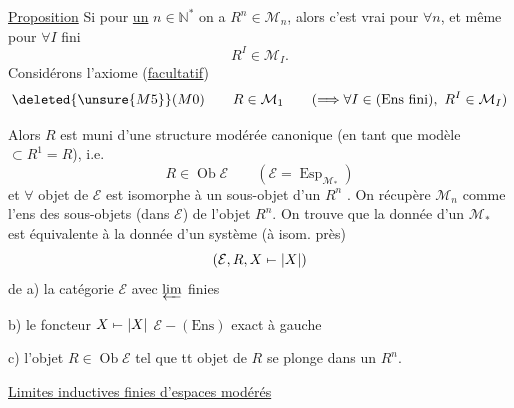 \uline{Proposition} Si pour \uline{un} $n\in\mathbb N^*$ on a  $R^n\in\mathcal M_n$, alors c'est vrai pour $\forall n$, et même pour $\forall I$ fini 
\[
R^I\in\mathcal M_I.
\]
Considérons l'axiome (\uline{facultatif})
\[
\deleted{\unsure{M5}}(M0)\qquad R\in\mathcal M_1\qquad(\Longrightarrow\forall I\in(\mathrm{Ens\ fini}),\ R^I\in\mathcal M_I)
\]

Alors $R$ est muni d'une structure modérée canonique (en tant que modèle $\subset R^1=R$), i.e.
\[
 R\in\operatorname{Ob}\mathcal E\qquad(\mathcal E=\operatorname{Esp}_{\mathcal M_*})
\]
et $\forall$ objet de $\mathcal E$ est isomorphe à un sous-objet d'un $R^n$ . On récupère $\mathcal M_n$ comme l'ens des  sous-objets (dans $\mathcal E$) de l'objet $R^n$. On trouve que la donnée d'un $\mathcal M_*$ est équivalente à la donnée d'un système (à isom. près)
\[
 (\mathcal E,R,X\mathrel{\mapstochar\relbar}|X|)
\]
de a) la catégorie $\mathcal E$ avec $\varprojlim$ finies

b) le foncteur $X\mathrel{\mapstochar\relbar}|X|$ $\mathcal E\mathbin{-}(\mathrm{Ens})$ exact à gauche

c) l'objet $R\in\operatorname{Ob}\mathcal E$ tel que tt objet de $R$ se plonge dans un $R^n$.



\uline{Limites inductives finies d'espaces modérés}

